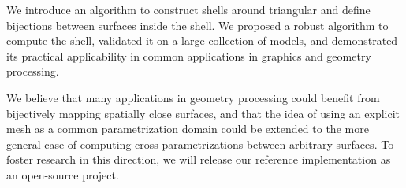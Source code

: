 We introduce an algorithm to construct shells around triangular  and define bijections between surfaces inside the shell. We proposed a robust algorithm to compute the shell,
validated it on a large collection of models, and demonstrated its practical applicability in common applications in graphics and geometry processing. 


We believe that many applications in geometry processing could benefit from bijectively mapping spatially close surfaces, and that the idea of using an explicit mesh as a common parametrization domain could be extended to the more general case of computing cross-parametrizations between arbitrary surfaces. To foster research in this direction, we will release our reference implementation as an open-source project.





